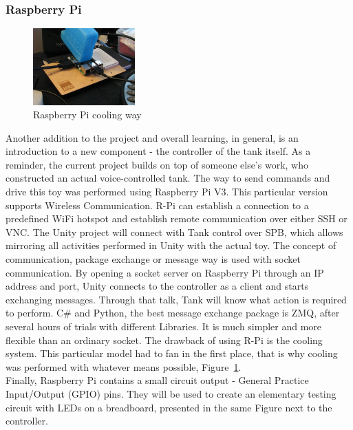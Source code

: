 \subsubsection{Raspberry Pi} \label{subsec:RPI}
\begin{figure}
	\begin{center}
		\includegraphics[width=0.35\textwidth]{project/images/IMG_1194.JPG}
	\end{center}
	\caption{Raspberry Pi cooling way}
	\label{fig:RPI}
\end{figure}
Another addition to the project and overall learning, in general, is an introduction to a new component - the controller of the tank itself. 
As a reminder, the current project builds on top of someone else's work, who constructed an actual voice-controlled tank. 
The way to send commands and drive this toy was performed using Raspberry Pi V3.
This particular version supports Wireless Communication.
R-Pi can establish a connection to a predefined WiFi hotspot and establish remote communication over either SSH or VNC. 
The Unity project will connect with Tank control over SPB, which allows mirroring all activities performed in Unity with the actual toy.
The concept of communication, package exchange or message way is used with socket communication.
By opening a socket server on Raspberry Pi through an IP address and port, Unity connects to the controller as a client and starts exchanging messages.
Through that talk, Tank will know what action is required to perform.
C\# and Python, the best message exchange package is ZMQ, after several hours of trials with different Libraries.
It is much simpler and more flexible than an ordinary socket.
The drawback of using R-Pi is the cooling system.
This particular model had to fan in the first place, that is why cooling was performed with whatever means possible, Figure~\ref{fig:RPI}.\\
Finally, Raspberry Pi contains a small circuit output - General Practice Input/Output (GPIO) pins.
They will be used to create an elementary testing circuit with LEDs on a breadboard, presented in the same Figure next to the controller.